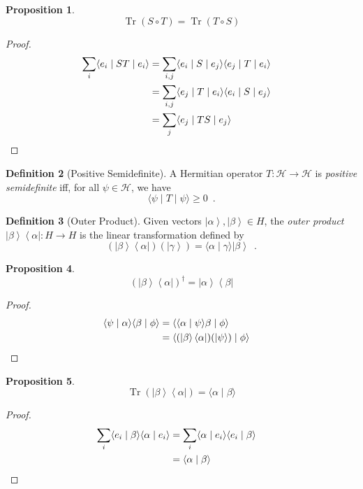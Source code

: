 \documentclass{book}
\let\qed\relax
\newtheorem{prop}{Proposition}[chapter]
\theoremstyle{definition}
\newtheorem{df}[prop]{Definition}
\newcommand{\bra}[1]{\ensuremath{\left\langle {#1} \right|}}
\newcommand{\ket}[1]{\ensuremath{\left| {#1} \right\rangle}}
\newcommand{\Tr}{\ensuremath{\operatorname{Tr}}}
\begin{document}
\begin{prop}
\[ \Tr(S \circ T) = \Tr(T \circ S) \]
\end{prop}

\begin{proof}
\pf
\begin{align*}
\sum_i \langle e_i \mid ST \mid e_i \rangle
& = \sum_{i,j} \langle e_i \mid S \mid e_j \rangle \langle e_j \mid T \mid e_i \rangle \\
& = \sum_{i,j} \langle e_j \mid T \mid e_i \rangle \langle e_i \mid S \mid e_j \rangle \\
& = \sum_j \langle e_j \mid TS \mid e_j \rangle & \qed
\end{align*}
\end{proof}

\begin{df}[Positive Semidefinite]
A Hermitian operator $T : \mathcal{H} \rightarrow \mathcal{H}$ is \emph{positive semidefinite} iff, for all $\psi \in \mathcal{H}$, we have
\[ \langle \psi \mid T \mid \psi \rangle \geq 0 \enspace . \]
\end{df}

\begin{df}[Outer Product]
Given vectors $\ket{\alpha}, \ket{\beta} \in H$, the \emph{outer product} $\ket{\beta} \bra{\alpha} : H \rightarrow H$ is the linear transformation defined by
\[ (\ket{\beta} \bra{\alpha})(\ket{\gamma}) = \langle \alpha \mid \gamma \rangle \ket{\beta} \enspace . \]
\end{df}

\begin{prop}
\[ (\ket{\beta} \bra{\alpha})^\dagger = \ket{\alpha} \bra{\beta} \]
\end{prop}

\begin{proof}
\pf
\begin{align*}
\langle \psi \mid \alpha \rangle \langle \beta \mid \phi \rangle
& = \langle \langle \alpha \mid \psi \rangle \beta \mid \phi \rangle \\
& = \langle (\ket{\beta} \bra{\alpha})(\ket{\psi}) \mid \phi \rangle & \qed
\end{align*}
\end{proof}

\begin{prop}
\[ \Tr(\ket{\beta} \bra{\alpha}) = \langle \alpha \mid \beta \rangle \]
\end{prop}

\begin{proof}
\pf
\begin{align*}
\sum_i \langle e_i \mid \beta \rangle \langle \alpha \mid e_i \rangle
& = \sum_i \langle \alpha \mid e_i \rangle \langle e_i \mid \beta \rangle \\
& = \langle \alpha \mid \beta \rangle & \qed
\end{align*}
\end{proof}
\end{document}
